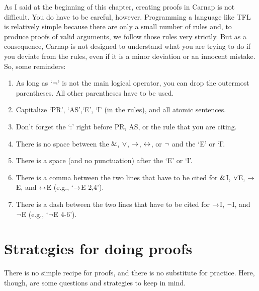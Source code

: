 As I said at the beginning of this chapter, creating proofs in Carnap is not difficult. You do have to be careful, however. Programming a language like TFL is relatively simple because there are only a small number of rules and, to produce proofs of valid arguments, we follow those rules very strictly. But as a consequence, Carnap is not designed to understand what you are trying to do if you deviate from the rules, even if it is a minor deviation or an innocent mistake. So, some reminders:
\begin{enumerate}
\itemsep-.3mm
	\item As long as `${\neg}$' is not the main logical operator, you can drop the outermost parentheses. All other parentheses have to be used. 
	\item Capitalize `PR', `AS',`E', `I' (in the rules), and all atomic sentences.
	\item Don't forget the `:' right before PR, AS, or the rule that you are citing. 
	\item There is no space between the $\mathbin{\&}$, $\vee$, $\rightarrow$, $\leftrightarrow$, or ${\neg}$ and the `E' or `I'.  
	\item There is a space (and no punctuation) after the `E' or `I'. 
	\item There is a comma between the two lines that have to be cited for $\mathbin{\&}$I, $\vee$E, $\rightarrow$E, and $\leftrightarrow$E (e.g., `$\rightarrow$E 2,4').
	\item There is a dash between the two lines that have to be cited for $\rightarrow$I, ${\neg}$I, and ${\neg}$E (e.g., `${\neg}$E 4-6').
\end{enumerate}





\chapter{Strategies for doing proofs}
There is no simple recipe for proofs, and there is no substitute for practice. Here, though, are some questions and strategies to keep in mind.

